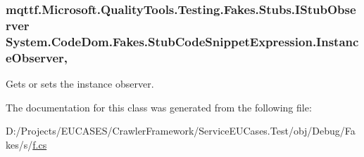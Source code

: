 \hypertarget{class_system_1_1_code_dom_1_1_fakes_1_1_stub_code_snippet_expression_a52214da07c14c09f24c4d4aac2253332}{
\subsubsection[{Instance\-Observer}]{\setlength{\rightskip}{0pt plus 5cm}mqttf.\-Microsoft.\-Quality\-Tools.\-Testing.\-Fakes.\-Stubs.\-I\-Stub\-Observer System.\-Code\-Dom.\-Fakes.\-Stub\-Code\-Snippet\-Expression.\-Instance\-Observer\hspace{0.3cm}{\ttfamily [get]}, {\ttfamily [set]}}}\label{class_system_1_1_code_dom_1_1_fakes_1_1_stub_code_snippet_expression_a52214da07c14c09f24c4d4aac2253332}


Gets or sets the instance observer.



The documentation for this class was generated from the following file\-:\begin{DoxyCompactItemize}
\item 
D\-:/\-Projects/\-E\-U\-C\-A\-S\-E\-S/\-Crawler\-Framework/\-Service\-E\-U\-Cases.\-Test/obj/\-Debug/\-Fakes/s/\hyperlink{s_2f_8cs}{f.\-cs}\end{DoxyCompactItemize}
